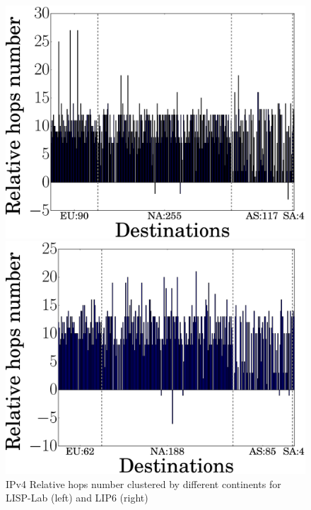 \begin{figure}[!t]
	\begin{minipage}[c]{.49\linewidth}
		\begin{center}
			\includegraphics[width=\textwidth]{Pics/v4/Relative_hops_num_LISP-Lab-FranceIX_changed_60.eps}
		\end{center}
	\end{minipage}
	\begin{minipage}[c]{.49\linewidth}
		\begin{center}
			\includegraphics[width=\textwidth]{Pics/v4/Relative_hops_num_LIP6-FranceIX_changed_60.eps}
		\end{center}
	\end{minipage}
	\vspace{-0.5mm}
	\caption{IPv4 Relative hops number clustered by different continents for LISP-Lab (left) and LIP6 (right)}
	\label{v4_Relative_hops_num}
\end{figure}

